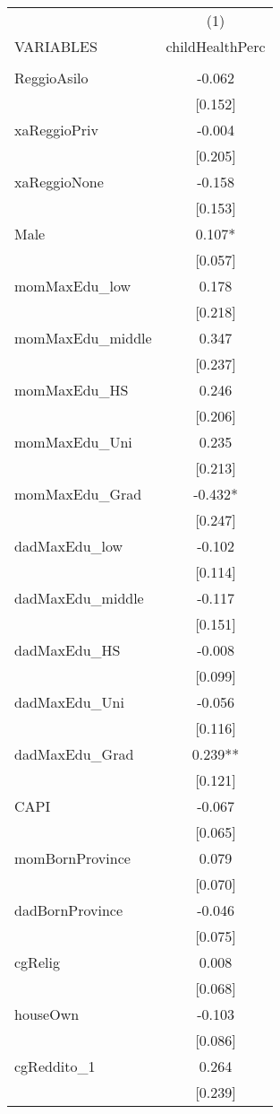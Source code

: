 \documentclass[]{article}
\begin{document}
\begin{tabular}{lc} \hline
 & (1) \\
VARIABLES & childHealthPerc \\ \hline
 &  \\
ReggioAsilo & -0.062 \\
 & [0.152] \\
xaReggioPriv & -0.004 \\
 & [0.205] \\
xaReggioNone & -0.158 \\
 & [0.153] \\
Male & 0.107* \\
 & [0.057] \\
momMaxEdu\_low & 0.178 \\
 & [0.218] \\
momMaxEdu\_middle & 0.347 \\
 & [0.237] \\
momMaxEdu\_HS & 0.246 \\
 & [0.206] \\
momMaxEdu\_Uni & 0.235 \\
 & [0.213] \\
momMaxEdu\_Grad & -0.432* \\
 & [0.247] \\
dadMaxEdu\_low & -0.102 \\
 & [0.114] \\
dadMaxEdu\_middle & -0.117 \\
 & [0.151] \\
dadMaxEdu\_HS & -0.008 \\
 & [0.099] \\
dadMaxEdu\_Uni & -0.056 \\
 & [0.116] \\
dadMaxEdu\_Grad & 0.239** \\
 & [0.121] \\
CAPI & -0.067 \\
 & [0.065] \\
momBornProvince & 0.079 \\
 & [0.070] \\
dadBornProvince & -0.046 \\
 & [0.075] \\
cgRelig & 0.008 \\
 & [0.068] \\
houseOwn & -0.103 \\
 & [0.086] \\
cgReddito\_1 & 0.264 \\
 & [0.239] \\

\end{tabular}
\end{document}
